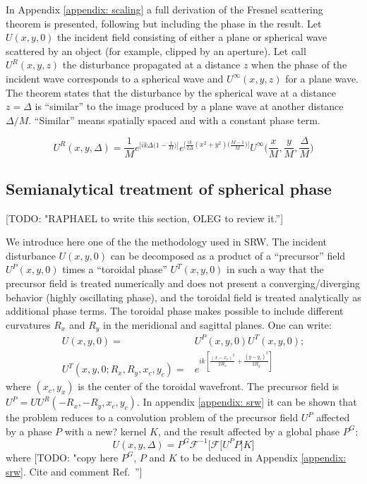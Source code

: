 \documentclass{iucr}              %
\newcommand{\todo}[1]{{\color{red}[TODO: "#1'']}}
\newcommand{\inred}[1]{{\color{red}#1}}
\begin{document}
In Appendix \ref{appendix: scaling} a full derivation of the Fresnel scattering theorem is presented, following \cite{paganin_book} but including the phase in the result. Let $U(x,y,0)$ the incident field consisting of either a plane or spherical wave scattered by an object (for example, clipped by an aperture). Let call $U^R(x,y,z)$ the disturbance propagated at a distance $z$ when the phase of the incident wave corresponds to a spherical wave and $U^\infty(x,y,z)$ for a plane wave. The theorem states that the disturbance by the spherical wave at a distance $z=\Delta$ is ``similar'' to the image produced by a plane wave at another distance $\Delta/M$. ``Similar'' means spatially spaced and with a constant phase term.

\begin{equation}
	U^R (x, y, \Delta)= \frac{1}{M} e^{\big[ik\Delta \big({1-\frac{1}{M}}\big)\big]} e^{\big[\frac{ik}{2\Delta}(x^2+y^2)\big(\frac{M-1}{M}\big)\big]} U^{\infty} \Big(\frac{x}{M}, \frac{y}{M}, \frac{\Delta}{M}\Big)
\end{equation}


\subsection{Semianalytical treatment of spherical phase}
\label{subch: semianalytical}

\todo{RAPHAEL to write this section, OLEG to review it.}

We introduce here one of the the methodology used in SRW. The incident disturbance $U(x,y,0)$ can be decomposed as a product of a ``precursor'' field $U^P(x,y,0)$ times a ``toroidal phase'' $U^T(x,y,0)$ in such a way that the precursor field is treated numerically and does not present a converging/diverging behavior (highly oscillating phase), and the toroidal field is treated analytically as additional phase terms. The toroidal phase makes possible to include different curvatures $R_x$ and $R_y$ in the meridional and sagittal planes. One can write: 
\begin{equation}
\begin{aligned}
U(x,y,0) =& U^P(x,y,0) U^T(x,y,0); \\
U^T(x,y,0;R_x,R_y,x_c,y_c) =& e^{ik [\frac{(x-x_c)^2}{2 R_x} + \frac{(y-y_c)^2}{2 R_y}]}
\end{aligned}
\end{equation}
where $(x_c,y_x)$ is the center of the toroidal wavefront. The precursor field is $U^P=U U^R(-R_x,-R_y,x_c,y_c)$. 
In appendix \ref{appendix: srw} it can be shown that the problem reduces to a convolution problem of the precursor field $U^P$ affected by a phase $P$ with a \inred{new?} kernel $K$, and the result affected by a global phase $P^G$: 
\begin{equation}
\label{eq: srw in convolution form}
U(x, y, \Delta) = P^G \mathcal{F}^{-1}\Big[\mathcal{F}\big[U^P P \big] K \Big]
\end{equation}
where \todo{copy here $P^G$, $P$ and $K$ to be deduced in Appendix \ref{appendix: srw}. Cite and comment Ref.~\cite{wyrowski}}
\end{document}
